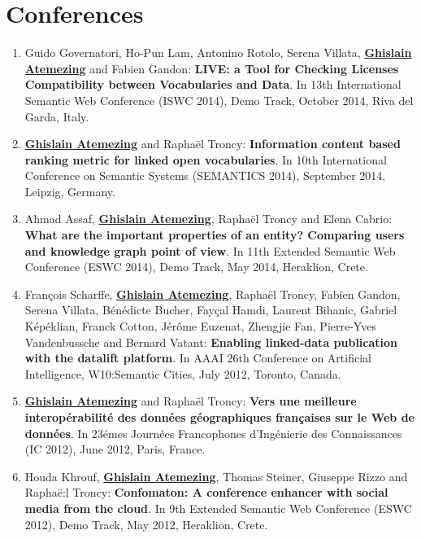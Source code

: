 \section*{Conferences}\label{sec:conf}
\begin{enumerate}
 

 \item {G}uido {G}overnatori, {H}o-{P}un {L}am, {A}ntonino {R}otolo, {S}erena {V}illata, \underline{\textbf{{G}hislain {A}temezing}} and {F}abien {G}andon: \textbf{LIVE: a Tool for Checking Licenses Compatibility between Vocabularies and Data}. In 13th International Semantic Web Conference (ISWC 2014), Demo Track, {O}ctober 2014, {R}iva del {G}arda, {I}taly.

 \item \underline{\textbf{Ghislain Atemezing}} and Rapha{\"e}l Troncy: \textbf{{I}nformation content based ranking metric for linked open vocabularies}. In 10th {I}nternational {C}onference on {S}emantic {S}ystems (SEMANTICS 2014), {S}eptember 2014, {L}eipzig, {G}ermany.

 \item {A}hmad {A}ssaf, \underline{\textbf{Ghislain Atemezing}}, {R}apha{\"e}l {T}roncy and {E}lena {C}abrio: \textbf{{W}hat are the important properties of an entity? {C}omparing users and knowledge graph point of view}. In 11th {E}xtended {S}emantic {W}eb {C}onference (ESWC 2014), Demo Track, May 2014, {H}eraklion, {C}rete.
 
  \item Fran\c cois Scharffe, \underline{\textbf{Ghislain Atemezing}}, Rapha\"{e}l Troncy, Fabien Gandon, Serena Villata, B\'{e}n\'{e}dicte Bucher, Fay\c cal Hamdi, Laurent Bihanic, Gabriel K\'{e}p\'{e}klian, Franck Cotton, J\'{e}r\^{o}me Euzenat, Zhengjie Fan, Pierre-Yves Vandenbussche and Bernard Vatant: \textbf{Enabling linked-data publication with the datalift platform}. In AAAI 26th Conference on Artificial Intelligence, W10:Semantic Cities, July 2012, Toronto, Canada.
  
  
 \item \underline{\textbf{Ghislain Atemezing}} and Rapha\"{e}l Troncy: \textbf{Vers une meilleure interop\'{e}rabilit\'{e} des donn\'{e}es g\'{e}ographiques fran\c caises sur le Web de donn\'{e}es}. In 23\'{e}mes Journ\'{e}es Francophones d'Ing\'{e}nierie des Connaissances (IC 2012), June 2012, Paris, France.
 
 
 \item Houda Khrouf, \underline{\textbf{Ghislain Atemezing}}, Thomas Steiner, Giuseppe Rizzo and Rapha\"{e}:l Troncy: \textbf{Confomaton: A conference enhancer with social media from the cloud}. In 9th Extended Semantic Web Conference (ESWC 2012), Demo Track, May 2012, Heraklion, Crete.
 


\end{enumerate}

